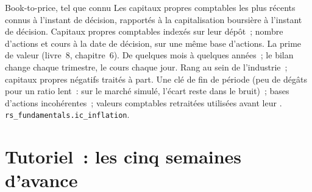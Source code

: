 \begin{predictorcard}{Book-to-price, tel que connu}\label{pred:rs:fundamental-analyst-and-event-features:bp}
 Les capitaux propres comptables les plus récents connus à l'instant de décision, rapportés à la capitalisation boursière à l'instant de décision.
 Capitaux propres comptables indexés sur leur dépôt~; nombre d'actions et cours à la date de décision, sur une même base d'actions.
 La prime de valeur (livre~8, chapitre~6).
 De quelques mois à quelques années~; le bilan change chaque trimestre, le cours chaque jour.
 Rang au sein de l'industrie~; capitaux propres négatifs traités à part.
 Une clé de fin de période (peu de dégâts pour un ratio lent~: sur le marché simulé, l'écart reste dans le bruit)~;
bases d'actions incohérentes~; valeurs comptables retraitées utilisées avant leur .
 \texttt{rs\_fundamentals.ic\_inflation}.
\end{predictorcard}

\section{Tutoriel~: les cinq semaines d'avance}\label{tut:rs:fundamental-analyst-and-event-features:tut}


